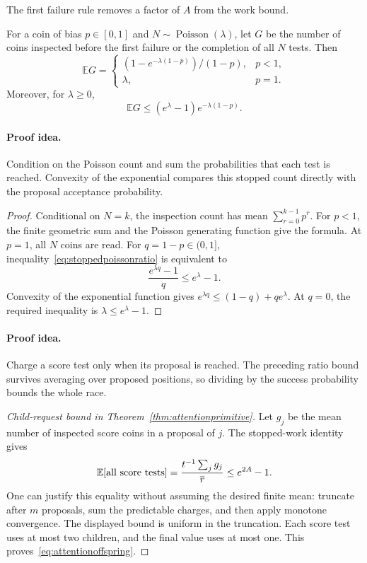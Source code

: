 The first failure rule removes a factor of $A$ from the work bound.

\begin{lemma}\label{lem:stoppedpoissonattention}
For a coin of bias $p\in[0,1]$ and $N\sim\operatorname{Poisson}(\lambda)$,
let $G$ be the number of coins inspected before the first failure or the
completion of all $N$ tests.  Then
\[
 \mathbb E G=
 \begin{cases}
 (1-e^{-\lambda(1-p)})/(1-p),&p<1,\\
 \lambda,&p=1.
 \end{cases}
\]
Moreover, for $\lambda\ge0$,
\begin{equation}\label{eq:stoppedpoissonratio}
 \mathbb E G\le(e^\lambda-1)e^{-\lambda(1-p)}.
\end{equation}
\end{lemma}
\paragraph{Proof idea.}
Condition on the Poisson count and sum the probabilities that each test is reached.  Convexity of the exponential compares this stopped count directly with the proposal acceptance probability.

\begin{proof}
Conditional on $N=k$, the inspection count has mean
$\sum_{r=0}^{k-1}p^r$.  For $p<1$, the finite geometric sum and the Poisson
generating function give the formula.  At $p=1$, all $N$ coins are read.
For $q=1-p\in(0,1]$, inequality~\eqref{eq:stoppedpoissonratio} is equivalent
to
\[
 \frac{e^{\lambda q}-1}{q}\le e^\lambda-1.
\]
Convexity of the exponential function gives
$e^{\lambda q}\le(1-q)+qe^\lambda$.  At $q=0$, the required inequality is
$\lambda\le e^\lambda-1$.
\end{proof}

\paragraph{Proof idea.}
Charge a score test only when its proposal is reached.  The preceding ratio bound survives averaging over proposed positions, so dividing by the success probability bounds the whole race.

\begin{proof}[Child-request bound in Theorem~\ref{thm:attentionprimitive}]
Let $g_j$ be the mean number of inspected score coins in a proposal of
$j$.  The stopped-work identity gives
\[
 \mathbb E[\hbox{all score tests}]
 =\frac{t^{-1}\sum_jg_j}{\overline r}
 \le e^{2A}-1.
\]
One can justify this equality without assuming the desired finite mean:
truncate after $m$ proposals, sum the predictable charges, and then apply
monotone convergence.  The displayed bound is uniform in the truncation.
Each score test uses at most two children, and the final value uses at most
one.  This proves~\eqref{eq:attentionoffspring}.
\end{proof}

